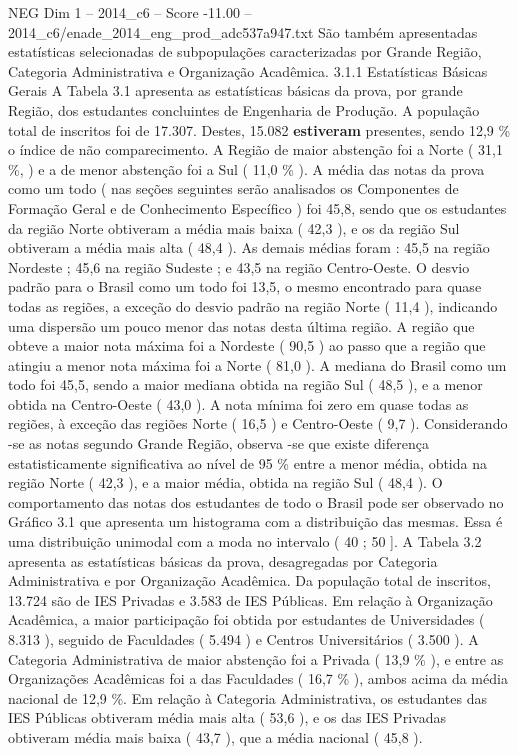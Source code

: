 \begin{textsample}{NEG Dim 1 – 2014\_c6 – Score -11.00 – 2014\_c6/enade\_2014\_eng\_prod\_adc537a947.txt}
São também apresentadas estatísticas selecionadas de subpopulações caracterizadas por Grande Região, Categoria Administrativa e Organização Acadêmica. 3.1.1 Estatísticas Básicas Gerais A Tabela 3.1 apresenta as estatísticas básicas da prova, por grande Região, dos estudantes concluintes de Engenharia de Produção.
A população total de inscritos foi de 17.307.
Destes, 15.082 \textbf{estiveram} presentes, sendo 12,9 \% o índice de não comparecimento.
A Região de maior abstenção foi a Norte ( 31,1 \%, ) e a de menor abstenção foi a Sul ( 11,0 \% ).
A média das notas da prova como um todo ( nas seções seguintes serão analisados os Componentes de Formação Geral e de Conhecimento Específico ) foi 45,8, sendo que os estudantes da região Norte obtiveram a média mais baixa ( 42,3 ), e os da região Sul obtiveram a média mais alta ( 48,4 ).
As demais médias foram : 45,5 na região Nordeste ; 45,6 na região Sudeste ; e 43,5 na região Centro-Oeste.
O desvio padrão para o Brasil como um todo foi 13,5, o mesmo encontrado para quase todas as regiões, a exceção do desvio padrão na região Norte ( 11,4 ), indicando uma dispersão um pouco menor das notas desta última região.
A região que obteve a maior nota máxima foi a Nordeste ( 90,5 ) ao passo que a região que atingiu a menor nota máxima foi a Norte ( 81,0 ).
A mediana do Brasil como um todo foi 45,5, sendo a maior mediana obtida na região Sul ( 48,5 ), e a menor obtida na Centro-Oeste ( 43,0 ).
A nota mínima foi zero em quase todas as regiões, à exceção das regiões Norte ( 16,5 ) e Centro-Oeste ( 9,7 ).
Considerando -se as notas segundo Grande Região, observa -se que existe diferença estatisticamente significativa ao nível de 95 \% entre a menor média, obtida na região Norte ( 42,3 ), e a maior média, obtida na região Sul ( 48,4 ).
O comportamento das notas dos estudantes de todo o Brasil pode ser observado no Gráfico 3.1 que apresenta um histograma com a distribuição das mesmas.
Essa é uma distribuição unimodal com a moda no intervalo ( 40 ; 50 ].
A Tabela 3.2 apresenta as estatísticas básicas da prova, desagregadas por Categoria Administrativa e por Organização Acadêmica.
Da população total de inscritos, 13.724 são de IES Privadas e 3.583 de IES Públicas.
Em relação à Organização Acadêmica, a maior participação foi obtida por estudantes de Universidades ( 8.313 ), seguido de Faculdades ( 5.494 ) e Centros Universitários ( 3.500 ).
A Categoria Administrativa de maior abstenção foi a Privada ( 13,9 \% ), e entre as Organizações Acadêmicas foi a das Faculdades ( 16,7 \% ), ambos acima da média nacional de 12,9 \%.
Em relação à Categoria Administrativa, os estudantes das IES Públicas obtiveram média mais alta ( 53,6 ), e os das IES Privadas obtiveram média mais baixa ( 43,7 ), que a média nacional ( 45,8 ).

\end{textsample}
